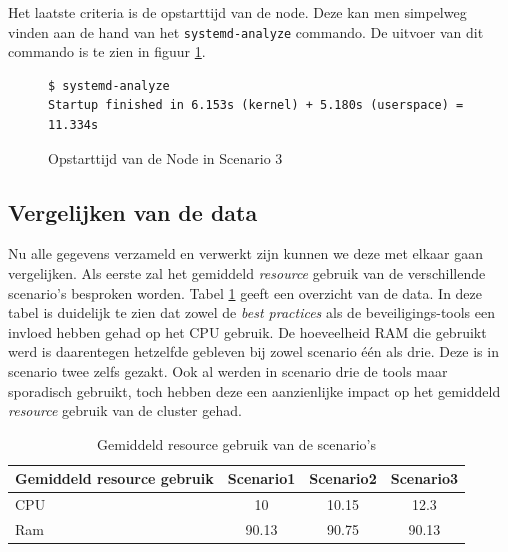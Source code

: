 Het laatste criteria is de opstarttijd van de node. Deze kan men simpelweg vinden aan de hand van het \verb|systemd-analyze| commando. De uitvoer van dit commando is te zien in figuur \ref{SC3_StartTime}.

\begin{figure}[h]
	\centering
	\begin{verbatim} 
$ systemd-analyze
Startup finished in 6.153s (kernel) + 5.180s (userspace) = 11.334s
	\end{verbatim}
	\caption{Opstarttijd van de Node in Scenario 3}
	\label{SC3_StartTime}
\end{figure}

\clearpage
\subsection{Vergelijken van de data}
Nu alle gegevens verzameld en verwerkt zijn kunnen we deze met elkaar gaan vergelijken. Als eerste zal het gemiddeld \textit{resource} gebruik van de verschillende scenario's besproken worden. Tabel \ref{tab:AVGResource} geeft een overzicht van de data. In deze tabel is duidelijk te zien dat zowel de \textit{best practices} als de beveiligings-tools een invloed hebben gehad op het CPU gebruik. De hoeveelheid RAM die gebruikt werd is daarentegen hetzelfde gebleven bij zowel scenario één als drie. Deze is in scenario twee zelfs gezakt. Ook al werden in scenario drie de tools maar sporadisch gebruikt, toch hebben deze een aanzienlijke impact op het gemiddeld \textit{resource} gebruik van de cluster gehad. 
\begin{table}[h]
	\centering
	\begin{tabular}{lccc}
		Gemiddeld resource gebruik & Scenario1 & Scenario2 & Scenario3 \\ \hline
		CPU                        & 10        & 10.15        & 12.3      \\ \hline
		Ram                        & 90.13     & 90.75        & 90.13    
	\end{tabular}
	\caption{Gemiddeld resource gebruik van de scenario's}
	\label{tab:AVGResource}
\end{table}

